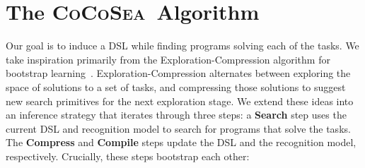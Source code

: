 \documentclass{article}
\newcommand{\system}{\textsc{CoCoSea}~}
\begin{document}
 \section{The \system Algorithm}

 Our goal is to induce a DSL while finding programs solving each of the
tasks.  We take inspiration primarily from the
Exploration-Compression algorithm for bootstrap
learning~\cite{Dechter:2013:BLV:2540128.2540316}.  Exploration-Compression
alternates between exploring the space of solutions to a set of tasks,
and compressing those solutions to suggest new search primitives
for the next exploration stage.
We extend these ideas into an inference strategy that iterates
through three steps: a \textbf{Search} step uses the current DSL and
recognition model to search for programs that solve the tasks.  The
\textbf{Compress} and \textbf{Compile} steps update the DSL and the
recognition model, respectively.  Crucially, these steps bootstrap 
each other:

\end{document}
